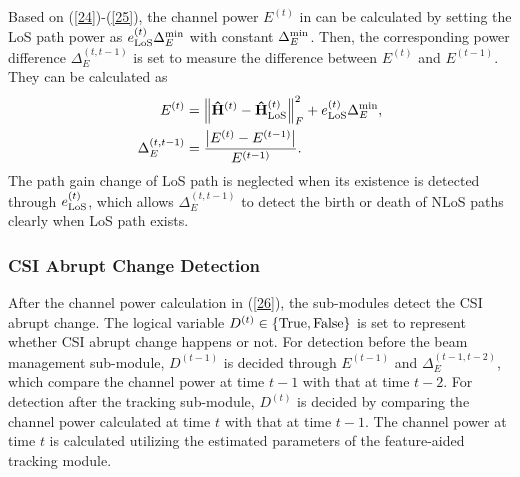 \documentclass[journal,12pt,onecolumn,draftclsnofoot,]{IEEEtran}
\begin{document}
Based on (\ref{24})-(\ref{25}), the channel power ${E^{(t )}}$ in \cite{a14} can be calculated by setting the LoS path power as $e_{{\rm{LoS}}}^{(t )}\Delta _E^{\rm min}$ with constant $\Delta _E^{\rm min}$. 
Then, the corresponding power difference $\Delta _E^{({t,t - 1} )}$ is set to measure the difference between ${E^{(t )}}$ and ${E^{(t-1 )}}$.
They can be calculated as
\begin{subequations}\label{26}
\begin{align}
{E^{\left(t \right)}} &= {\left\| {{{ {{{{\bf{\hat H}}}^{\left(t \right)}} - {\bf{\hat H}}_{{\rm{LoS}}}^{\left(t \right)}}}}} \right\|^2_F} + e_{{\rm{LoS}}}^{\left(t \right)}\Delta _E^{\rm min},\\
\Delta _E^{\left({t,t - 1} \right)} &=\frac{ \left| {{E^{\left(t \right)}} - {E^{\left({t - 1} \right)}}} \right|}{{E^{\left({t - 1} \right)}}}.
\end{align}
\end{subequations}
\noindent The path gain change of LoS path is neglected when its existence is detected through $e_{{\rm{LoS}}}^{(t )}$, which allows $\Delta _E^{({t,t - 1} )}$ to detect the birth or death of NLoS paths clearly when LoS path exists.

\subsubsection{CSI Abrupt Change Detection}
After the channel power calculation in (\ref{26}), the sub-modules detect the CSI abrupt change. The logical variable ${D^{(t)}}\in \{ {\rm{True}},{\rm{False} }\}$ is set to represent whether CSI abrupt change happens or not.
For detection before the beam management sub-module, ${D^{(t-1)}}$ is decided through ${E^{(t-1 )}}$ and $\Delta _E^{({t-1,t - 2} )}$, which compare the channel power at time $t-1$ with that at time $t-2$.
For detection after the tracking sub-module, ${D^{(t)}}$ is decided by comparing the channel power calculated at time $t$ with that at time $t-1$. 
The channel power at time $t$ is calculated utilizing the estimated parameters of the feature-aided tracking module. 
\end{document}
